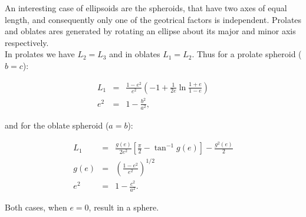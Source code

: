 An interesting case of ellipsoids are the spheroids, that have two axes of equal length, and consequently only one of the geotrical factors is independent.  Prolates and oblates ares generated by rotating an ellipse about its major and minor axis respectively. \\ In prolates we have $L_{2} = L_{3}$ and in oblates $L_{1} = L_{2}$.
Thus for a prolate spheroid ($b = c$):

\begin{eqnarray}
L_{1} & = & \frac{1-e^2}{e^2}\left(-1+\frac{1}{2e}\ln\frac{1+e}{1-e}\right)\\
 e^2& = &1-\frac{b^2}{a^2},
\end{eqnarray}

and for the oblate spheroid ($a = b$):

\begin{eqnarray}
L_{1} &=& \frac{g\left(e\right)}{2e^2}\left[\frac{\pi}{2} - \tan^{-1}g\left(e\right)\right]-\frac{g^2\left(e\right)}{2}\\
g\left(e\right) & = &\left(\frac{1-e^2}{e^2}\right)^{1/2}\\ 
e^2& = &1-\frac{c^2}{a^2}.
\end{eqnarray}

Both cases, when $e = 0$, result in a sphere.